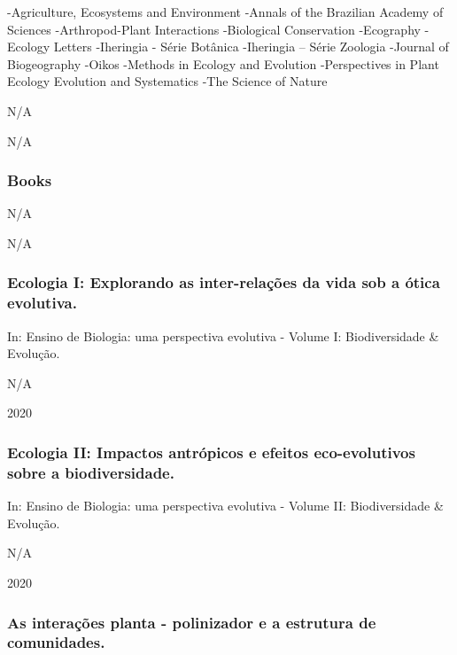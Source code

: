 \documentclass[
]{article}
\begin{document}
-Agriculture, Ecosystems and Environment -Annals of the Brazilian
Academy of Sciences -Arthropod-Plant Interactions -Biological
Conservation -Ecography -Ecology Letters -Iheringia - Série Botânica
-Iheringia -- Série Zoologia -Journal of Biogeography -Oikos -Methods in
Ecology and Evolution -Perspectives in Plant Ecology Evolution and
Systematics -The Science of Nature

N/A

N/A

\hypertarget{books-1}{%
\subsubsection{Books}\label{books-1}}

N/A

N/A

\hypertarget{ecologia-i-explorando-as-inter-relauxe7uxf5es-da-vida-sob-a-uxf3tica-evolutiva.}{%
\subsubsection{Ecologia I: Explorando as inter-relações da vida sob a
ótica
evolutiva.}\label{ecologia-i-explorando-as-inter-relauxe7uxf5es-da-vida-sob-a-uxf3tica-evolutiva.}}

In: Ensino de Biologia: uma perspectiva evolutiva - Volume I:
Biodiversidade \& Evolução.

N/A

2020

\hypertarget{ecologia-ii-impactos-antruxf3picos-e-efeitos-eco-evolutivos-sobre-a-biodiversidade.}{%
\subsubsection{Ecologia II: Impactos antrópicos e efeitos eco-evolutivos
sobre a
biodiversidade.}\label{ecologia-ii-impactos-antruxf3picos-e-efeitos-eco-evolutivos-sobre-a-biodiversidade.}}

In: Ensino de Biologia: uma perspectiva evolutiva - Volume II:
Biodiversidade \& Evolução.

N/A

2020

\hypertarget{as-interauxe7uxf5es-planta---polinizador-e-a-estrutura-de-comunidades.}{%
\subsubsection{As interações planta - polinizador e a estrutura de
comunidades.}\label{as-interauxe7uxf5es-planta---polinizador-e-a-estrutura-de-comunidades.}}
\end{document}
